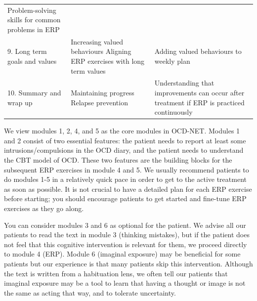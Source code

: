 \documentclass[]{book}
\theoremstyle{definition}
\theoremstyle{definition}
\theoremstyle{definition}
\theoremstyle{remark}
\begin{document}
\begin{longtable}[]{@{}lll@{}}
\begin{minipage}[t]{0.30\columnwidth}
Problem-solving skills for common problems in ERP\strut
\end{minipage}\tabularnewline
\begin{minipage}[t]{0.30\columnwidth}\raggedright
9. Long term goals and values\strut
\end{minipage} & \begin{minipage}[t]{0.30\columnwidth}\raggedright
Increasing valued behaviours Aligning ERP exercises with long term
values\strut
\end{minipage} & \begin{minipage}[t]{0.30\columnwidth}\raggedright
Adding valued behaviours to weekly plan\strut
\end{minipage}\tabularnewline
\begin{minipage}[t]{0.30\columnwidth}\raggedright
10. Summary and wrap up\strut
\end{minipage} & \begin{minipage}[t]{0.30\columnwidth}\raggedright
Maintaining progress Relapse prevention\strut
\end{minipage} & \begin{minipage}[t]{0.30\columnwidth}\raggedright
Understanding that improvements can occur after treatment if ERP is
practiced continuously\strut
\end{minipage}\tabularnewline
\bottomrule
\end{longtable}

We view modules 1, 2, 4, and 5 as the core modules in OCD-NET. Modules 1
and 2 consist of two essential features: the patient needs to report at
least some intrusions/compulsions in the OCD diary, and the patient
needs to understand the CBT model of OCD. These two features are the
building blocks for the subsequent ERP exercises in module 4 and 5. We
usually recommend patients to do modules 1-5 in a relatively quick pace
in order to get to the active treatment as soon as possible. It is not
crucial to have a detailed plan for each ERP exercise before starting;
you should encourage patients to get started and fine-tune ERP exercises
as they go along.

You can consider modules 3 and 6 as optional for the patient. We advise
all our patients to read the text in module 3 (thinking mistakes), but
if the patient does not feel that this cognitive intervention is
relevant for them, we proceed directly to module 4 (ERP). Module 6
(imaginal exposure) may be beneficial for some patients but our
experience is that many patients skip this intervention. Although the
text is written from a habituation lens, we often tell our patients that
imaginal exposure may be a tool to learn that having a thought or image
is not the same as acting that way, and to tolerate uncertainty.
\end{document}

